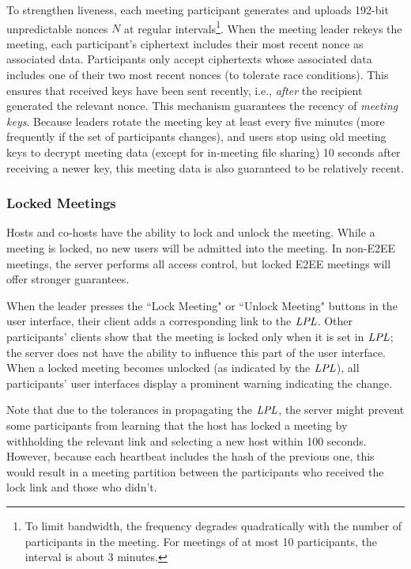 To strengthen liveness, each meeting participant generates and uploads 192-bit unpredictable nonces
$N$ at regular intervals\footnote{To limit bandwidth, the frequency degrades quadratically with the
number of participants in the meeting. For meetings of at most 10 participants, the interval is
about 3 minutes.}. When the meeting leader rekeys the meeting, each participant's ciphertext
includes their most recent nonce as associated data. Participants only accept ciphertexts whose
associated data includes one of their two most recent nonces (to tolerate race conditions). This
ensures that received keys have been sent recently, i.e., \textit{after} the recipient generated the
relevant nonce. This mechanism guarantees the recency of \textit{meeting keys}. Because leaders
rotate the meeting key at least every five minutes (more frequently if the set of participants
changes), and users stop using old meeting keys to decrypt meeting data (except for in-meeting file
sharing) 10 seconds after receiving a newer key, this meeting data is also guaranteed to be
relatively recent. 

\subsubsection{Locked Meetings}
\label{subsubsec:lockedmeetings}
Hosts and co-hosts have the ability to lock and unlock the meeting. While a meeting is locked, no
new users will be admitted into the meeting. In non-E2EE meetings, the server performs all access
control, but locked E2EE meetings will offer stronger guarantees.

When the leader presses the ``Lock Meeting" or ``Unlock Meeting" buttons in the user interface,
their client adds a corresponding link to the $\mathit{LPL}$. Other participants' clients show that the
meeting is locked only when it is set in $\mathit{LPL}$; the server does not have the ability to influence
this part of the user interface. When a locked meeting becomes unlocked (as indicated by the
$\mathit{LPL}$), all participants' user interfaces display a prominent warning indicating the change. 

Note that due to the tolerances in propagating the $\mathit{LPL}$, the server might prevent some participants
from learning that the host has locked a meeting by withholding the relevant link and selecting a
new host within 100 seconds. However, because each heartbeat includes the hash of the previous one,
this would result in a meeting partition between the participants who received the lock link and
those who didn't.

